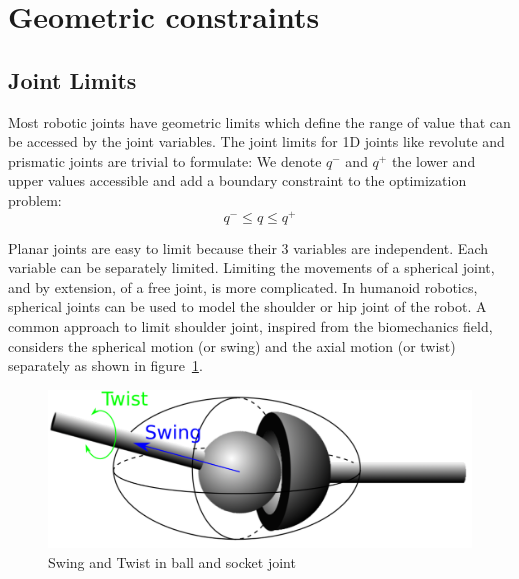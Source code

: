 \section{Geometric constraints}
\label{sec:geometric_constraints}


\subsection{Joint Limits}
\label{sub:joint_limits}


Most robotic joints have geometric limits which define the range of value that can be accessed by the joint variables.
The joint limits for 1D joints like revolute and prismatic joints are trivial to formulate: We denote $q^-$ and $q^+$ the lower and upper values accessible and add a boundary constraint to the optimization problem:
\begin{equation}
\label{eq:joint_limits}
  \boxed{q^- \leq q \leq q^+}
\end{equation}

Planar joints are easy to limit because their 3 variables are independent.
Each variable can be separately limited.
Limiting the movements of a spherical joint, and by extension, of a free joint, is more complicated.
In humanoid robotics, spherical joints can be used to model the shoulder or hip joint of the robot.
A common approach to limit shoulder joint, inspired from the biomechanics field, considers the spherical motion (or swing) and the axial motion (or twist) separately as shown in figure~\ref{fig:ballAndSocket}.

\begin{figure}[htpb]
  \centering
  \includegraphics[width=0.7\linewidth]{ballAndSocket.pdf}
  \caption{Swing and Twist in ball and socket joint}
\label{fig:ballAndSocket}
\end{figure}

